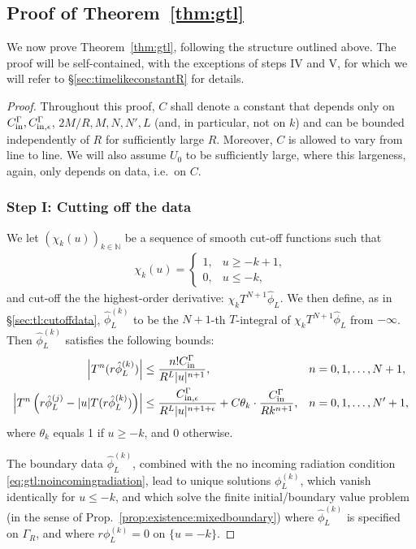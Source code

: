 \documentclass[11pt,english]{article}
\numberwithin{equation}{section}
\theoremstyle{remark}
\theoremstyle{plain}
\theoremstyle{remark}
\renewcommand{\(}{\left(}
\renewcommand{\)}{\right)}
\begin{document}
\subsection{Proof of Theorem~\ref{thm:gtl}}
We now prove Theorem~\ref{thm:gtl}, following the structure outlined above. The proof will be self-contained, with the exceptions of steps IV and V, for which we will refer to \S \ref{sec:timelikeconstantR} for details.

\begin{proof}
Throughout this proof, $C$ shall denote a constant that depends only on $C_{\mathrm{in}}^\Gamma,C_{\mathrm{in},\epsilon}^\Gamma$, $ 2M/R, M, N, N', L$ (and, in particular, not on $k$) and can be bounded independently of $R$ for sufficiently large $R$. Moreover, $C$ is  allowed to vary from line to line. We will also assume $U_0$ to be sufficiently large, where this largeness, again, only depends on data, i.e.\ on $C$.
\subsubsection*{Step I: Cutting off the data}
We let $(\chi_k(u))_{k\in\mathbb{N}}$ be a sequence of smooth cut-off functions such that
\begin{align*}
\chi_k(u)=\begin{cases}1,&u\geq -k+1,
				\\0,&u\leq -k,
\end{cases}
\end{align*}
and cut-off the the highest-order derivative: $\chi_kT^{N+1}\hat{\phi}_L$. We then define, as in \S \ref{sec:tl:cutoffdata}, $\hat{\phi}_L^{(k)}$ to be the $N+1$-th $T$-integral of $\chi_kT^{N+1}\hat{\phi}_L$ from $-\infty$. Then $\hat{\phi}_L^{(k)}$  satisfies the following bounds:
\begin{align}\label{eq:gtl:boundarydata1cutoff}
\left|T^n(r\hat{\phi}^{(k)}_L)\right|&\leq \frac{n! C_{\mathrm{in}}^\Gamma}{R^L|u|^{n+1}},&&n=0,1,\dots,N+1,\\
\left|T^n\left(r\hat{\phi}^{(j)}_L-|u|T(r\hat{\phi}^{(k)}_L)\right)\right|&\leq \frac{C_{\mathrm{in},\epsilon}^\Gamma}{R^L|u|^{n+1+\epsilon}}+C\theta_k\cdot\frac{C_{\mathrm{in}}^\Gamma}{Rk^{n+1}},&& n=0,1,\dots,N'+1,\label{eq:gtl:boundarydata2cutoff}
\end{align}
where $\theta_k$ equals 1 if $u\geq -k$, and 0 otherwise. 

The boundary data $\hat{\phi}^{(k)}_L$, combined with the no incoming radiation condition \eqref{eq:gtl:noincomingradiation}, lead to unique solutions $\phi_L^{(k)}$, which vanish identically for $u\leq -k$, and which solve the finite initial/boundary value problem (in the sense of Prop.~\ref{prop:existence:mixedboundary}) where $\hat{\phi}^{(k)}_L$ is specified on $\Gamma_R$, and where $r\phi_L^{(k)}=0$ on $\{u=-k\}$. 


\end{proof}
\end{document}
